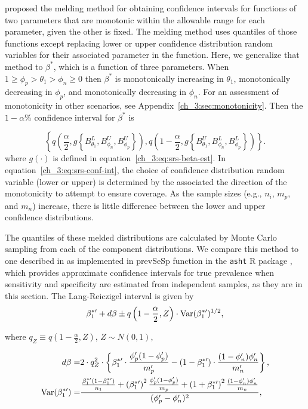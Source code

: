 \citet{FayP:2015} proposed the melding method for obtaining confidence intervals for functions of two parameters that are monotonic within the allowable range for each parameter, given the other is fixed.
The melding method uses quantiles of those functions except replacing lower or upper confidence distribution random variables for their associated parameter in the function.
Here, we generalize that method to $\beta^*$, which is a function of three parameters.
When $1 \geq \phi_p > \theta_1 > \phi_n \geq 0$ then $\beta^*$ is monotonically increasing in $\theta_1$, monotonically decreasing in $\phi_p$, and monotonically decreasing in $\phi_n$.
For an assessment of monotonicity in other scenarios, see Appendix~\ref{ch_3:sec:monotonicity}.
Then the \( 1-\alpha \)\% confidence interval for \( \beta^* \) is

\begin{equation}
    \left\{ q \left( \frac{\alpha}{2}, g \left\{ B_{\theta_1}^L, B_{\phi_n}^U, B_{\phi_p}^U \right\} \right),
            q \left( 1 - \frac{\alpha}{2}, g \left\{ B_{\theta_1}^U, B_{\phi_n}^L, B_{\phi_p}^L \right\}   \right) \right\}.
\label{ch_3:eq:srs-conf-int}
\end{equation}
where $g(\cdot)$ is defined in equation~\ref{ch_3:eq:srs-beta-est}.
In equation~\ref{ch_3:eq:srs-conf-int}, the choice of confidence distribution random variable (lower or upper) is determined by the associated the direction of the monotonicity to attempt to ensure coverage.
As the sample sizes (e.g., $n_i$, $m_p$, and $m_n$) increase, there is little difference between the lower and upper confidence distributions.


The quantiles of these melded distributions are calculated by Monte Carlo sampling from each of the component distributions.
We compare this method to one described in \citep{Lang:2014} as implemented in prevSeSp function in the \texttt{asht} R package \citep{asht}, which provides approximate confidence intervals for true prevalence when sensitivity and specificity are estimated from independent samples, as they are in this section.
The Lang-Reiczigel interval is given by
\begin{equation}
\beta_1^{*\prime} + d\beta \pm q\left( 1 - \frac{\alpha}{2}, Z \right) \cdot \operatorname{Var}(\beta_1^{*\prime})^{1/2},
\end{equation}

where \( q_Z \equiv q\left( 1 - \frac{\alpha}{2}, Z \right)\), \( Z \sim N(0,1) \),

\begin{align*}
    d\beta =& 2 \cdot q_Z^2 \cdot\left\{ \beta_1^{*\prime} \cdot \frac{\phi_p^\prime (1 - \phi_p^\prime)}{m_p^\prime} - (1 - \beta_1^{*\prime}) \cdot \frac{(1 - \phi_n^\prime) \phi_n^\prime}{m_n^\prime} \right\},\\
    \operatorname{Var}(\beta_1^{*\prime}) =& \frac{ \frac{\beta_1^{*\prime}(1 - \beta_1^{*\prime})}{n_1} + \left(\beta_1^{*\prime}\right)^2 \frac{\phi_p^\prime (1 - \phi_p^\prime)}{m_p} + \left(1 + \beta_1^{*\prime}\right)^2 \frac{(1 - \phi_n^\prime) \phi_n^\prime}{ m_n}}{(\phi_p^\prime - \phi_n^\prime)^2},
\end{align*}

